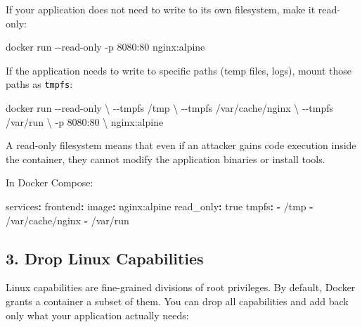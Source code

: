 \documentclass[11pt,american,a4paper,openany]{book}
\newenvironment{Shaded}{}{}
\newcommand{\AttributeTok}[1]{\textcolor[rgb]{0.49,0.56,0.16}{#1}}
\newcommand{\CharTok}[1]{\textcolor[rgb]{0.25,0.44,0.63}{#1}}
\newcommand{\FunctionTok}[1]{\textcolor[rgb]{0.02,0.16,0.49}{#1}}
\newcommand{\KeywordTok}[1]{\textcolor[rgb]{0.00,0.44,0.13}{\textbf{#1}}}
\newcommand{\NormalTok}[1]{#1}
\begin{document}
If your application does not need to write to its own filesystem, make
it read-only:

\begin{Shaded}
\begin{Highlighting}[]
\NormalTok{docker run {-}{-}read{-}only {-}p 8080:80 nginx:alpine}
\end{Highlighting}
\end{Shaded}

If the application needs to write to specific paths (temp files, logs),
mount those paths as \texttt{tmpfs}:

\begin{Shaded}
\begin{Highlighting}[]
\NormalTok{docker run {-}{-}read{-}only \textbackslash{}}
\NormalTok{  {-}{-}tmpfs /tmp \textbackslash{}}
\NormalTok{  {-}{-}tmpfs /var/cache/nginx \textbackslash{}}
\NormalTok{  {-}{-}tmpfs /var/run \textbackslash{}}
\NormalTok{  {-}p 8080:80 \textbackslash{}}
\NormalTok{  nginx:alpine}
\end{Highlighting}
\end{Shaded}

A read-only filesystem means that even if an attacker gains code
execution inside the container, they cannot modify the application
binaries or install tools.

In Docker Compose:

\begin{Shaded}
\begin{Highlighting}[]
\FunctionTok{services}\KeywordTok{:}
\AttributeTok{  }\FunctionTok{frontend}\KeywordTok{:}
\AttributeTok{    }\FunctionTok{image}\KeywordTok{:}\AttributeTok{ nginx:alpine}
\AttributeTok{    }\FunctionTok{read\_only}\KeywordTok{:}\AttributeTok{ }\CharTok{true}
\AttributeTok{    }\FunctionTok{tmpfs}\KeywordTok{:}
\AttributeTok{      }\KeywordTok{{-}}\AttributeTok{ /tmp}
\AttributeTok{      }\KeywordTok{{-}}\AttributeTok{ /var/cache/nginx}
\AttributeTok{      }\KeywordTok{{-}}\AttributeTok{ /var/run}
\end{Highlighting}
\end{Shaded}

\subsection{3. Drop Linux Capabilities}\label{drop-linux-capabilities}

Linux capabilities are fine-grained divisions of root privileges. By
default, Docker grants a container a subset of them. You can drop all
capabilities and add back only what your application actually needs:
\end{document}

